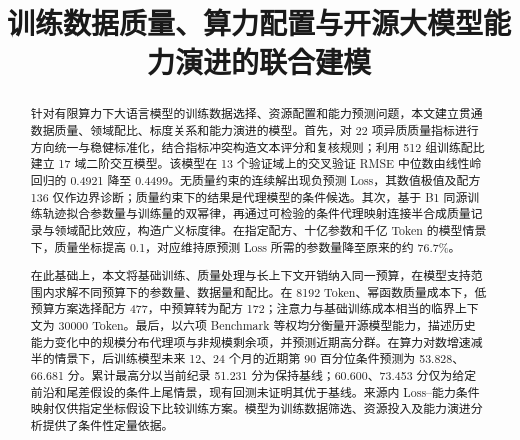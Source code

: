 \documentclass[bwprint]{gmcmthesis}
\title{训练数据质量、算力配置与开源大模型能力演进的联合建模}
\begin{document}
\maketitle

\begin{abstract}

针对有限算力下大语言模型的训练数据选择、资源配置和能力预测问题，本文建立贯通数据质量、领域配比、标度关系和能力演进的模型。首先，对 22 项异质质量指标进行方向统一与稳健标准化，结合指标冲突构造文本评分和复核规则；利用 512 组训练配比建立 17 域二阶交互模型。该模型在 13 个验证域上的交叉验证 RMSE 中位数由线性岭回归的 0.4921 降至 0.4499。无质量约束的连续解出现负预测 Loss，其数值极值及配方 136 仅作边界诊断；质量约束下的结果是代理模型的条件候选。其次，基于 B1 同源训练轨迹拟合参数量与训练量的双幂律，再通过可检验的条件代理映射连接半合成质量记录与领域配比效应，构造广义标度律。在指定配方、十亿参数和千亿 Token 的模型情景下，质量坐标提高 0.1，对应维持原预测 Loss 所需的参数量降至原来的约 76.7\%。

在此基础上，本文将基础训练、质量处理与长上下文开销纳入同一预算，在模型支持范围内求解不同预算下的参数量、数据量和配比。在 8192 Token、幂函数质量成本下，低预算方案选择配方 477，中预算转为配方 172；注意力与基础训练成本相当的临界上下文为 30000 Token。最后，以六项 Benchmark 等权均分衡量开源模型能力，描述历史能力变化中的规模分布代理项与非规模剩余项，并预测近期高分群。在算力对数增速减半的情景下，后训练模型未来 12、24 个月的近期第 90 百分位条件预测为 53.828、66.681 分。累计最高分以当前纪录 51.231 分为保持基线；60.600、73.453 分仅为给定前沿和尾差假设的条件上尾情景，现有回测未证明其优于基线。来源内 Loss--能力条件映射仅供指定坐标假设下比较训练方案。模型为训练数据筛选、资源投入及能力演进分析提供了条件性定量依据。


\end{abstract}

\pagestyle{plain}

\maketoc

\clearpage
















\end{document}
